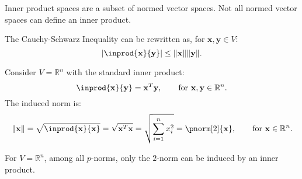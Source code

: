 \documentclass{huhtakm-template-book-v2}
\begin{document}
    \begin{rem}
        Inner product spaces are a subset of normed vector spaces. Not all normed vector spaces can define an inner product.
    \end{rem}
    \begin{rem}
        The Cauchy-Schwarz Inequality can be rewritten as, for $\mathbf{x}, \mathbf{y} \in V$:
        \begin{equation*}
            \abs{\inprod{\mathbf{x}}{\mathbf{y}}} \leq \norm{\mathbf{x}}\norm{\mathbf{y}}.
        \end{equation*}
    \end{rem}
    \begin{eg}
        Consider $V = \mathbb{R}^{n}$ with the standard inner product:
        \begin{equation*}
            \inprod{\mathbf{x}}{\mathbf{y}} = \mathbf{x}^{T}\mathbf{y}, \qquad \text{for } \mathbf{x}, \mathbf{y} \in \mathbb{R}^{n}.
        \end{equation*}
        The induced norm is:
        \begin{equation*}
            \norm{\mathbf{x}} = \sqrt{\inprod{\mathbf{x}}{\mathbf{x}}} = \sqrt{\mathbf{x}^{T}\mathbf{x}} = \sqrt{\sum_{i=1}^{n}x_{i}^{2}} = \pnorm[2]{\mathbf{x}}, \qquad \text{for } \mathbf{x} \in \mathbb{R}^{n}.
        \end{equation*}
    \end{eg}
    \begin{rem}
        For $V = \mathbb{R}^{n}$, among all $p$-norms, only the $2$-norm can be induced by an inner product.
    \end{rem}
    \newpage
    
\end{document}
